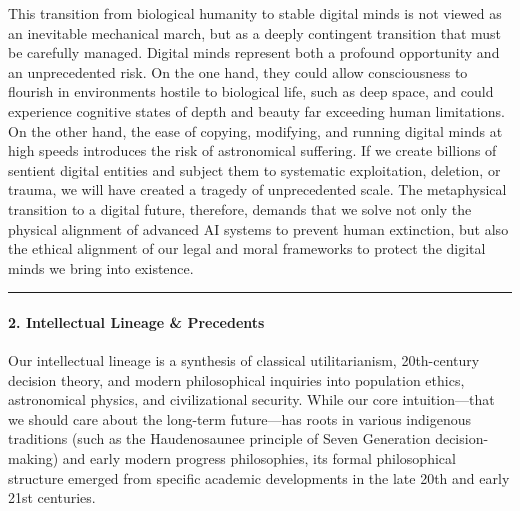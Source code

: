 This transition from biological humanity to stable digital minds is not
viewed as an inevitable mechanical march, but as a deeply contingent
transition that must be carefully managed. Digital minds represent both
a profound opportunity and an unprecedented risk. On the one hand, they
could allow consciousness to flourish in environments hostile to
biological life, such as deep space, and could experience cognitive
states of depth and beauty far exceeding human limitations. On the other
hand, the ease of copying, modifying, and running digital minds at high
speeds introduces the risk of astronomical suffering. If we create
billions of sentient digital entities and subject them to systematic
exploitation, deletion, or trauma, we will have created a tragedy of
unprecedented scale. The metaphysical transition to a digital future,
therefore, demands that we solve not only the physical alignment of
advanced AI systems to prevent human extinction, but also the ethical
alignment of our legal and moral frameworks to protect the digital minds
we bring into existence.

\begin{center}\rule{0.5\linewidth}{0.5pt}\end{center}

\paragraph{2. Intellectual Lineage \&
Precedents}\label{intellectual-lineage-precedents-2}

Our intellectual lineage is a synthesis of classical utilitarianism,
20th-century decision theory, and modern philosophical inquiries into
population ethics, astronomical physics, and civilizational security.
While our core intuition---that we should care about the long-term
future---has roots in various indigenous traditions (such as the
Haudenosaunee principle of Seven Generation decision-making) and early
modern progress philosophies, its formal philosophical structure emerged
from specific academic developments in the late 20th and early 21st
centuries.

